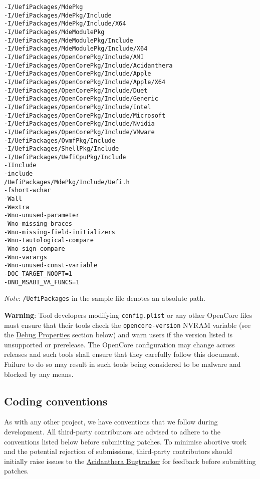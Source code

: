 \documentclass[]{article}
\begin{document}
\begin{lstlisting}[caption=ECC Configuration, label=eccfile, style=ocbash]
-I/UefiPackages/MdePkg
-I/UefiPackages/MdePkg/Include
-I/UefiPackages/MdePkg/Include/X64
-I/UefiPackages/MdeModulePkg
-I/UefiPackages/MdeModulePkg/Include
-I/UefiPackages/MdeModulePkg/Include/X64
-I/UefiPackages/OpenCorePkg/Include/AMI
-I/UefiPackages/OpenCorePkg/Include/Acidanthera
-I/UefiPackages/OpenCorePkg/Include/Apple
-I/UefiPackages/OpenCorePkg/Include/Apple/X64
-I/UefiPackages/OpenCorePkg/Include/Duet
-I/UefiPackages/OpenCorePkg/Include/Generic
-I/UefiPackages/OpenCorePkg/Include/Intel
-I/UefiPackages/OpenCorePkg/Include/Microsoft
-I/UefiPackages/OpenCorePkg/Include/Nvidia
-I/UefiPackages/OpenCorePkg/Include/VMware
-I/UefiPackages/OvmfPkg/Include
-I/UefiPackages/ShellPkg/Include
-I/UefiPackages/UefiCpuPkg/Include
-IInclude
-include
/UefiPackages/MdePkg/Include/Uefi.h
-fshort-wchar
-Wall
-Wextra
-Wno-unused-parameter
-Wno-missing-braces
-Wno-missing-field-initializers
-Wno-tautological-compare
-Wno-sign-compare
-Wno-varargs
-Wno-unused-const-variable
-DOC_TARGET_NOOPT=1
-DNO_MSABI_VA_FUNCS=1
\end{lstlisting}

\emph{Note}: \texttt{/UefiPackages} in the sample file denotes an absolute path.

\textbf{Warning}: Tool developers modifying \texttt{config.plist} or any other OpenCore
files must ensure that their tools check the \texttt{opencore-version} NVRAM variable
(see the \hyperref[miscdebugprops]{Debug Properties} section below) and warn users
if the version listed is unsupported or prerelease. The OpenCore configuration may change
across releases and such tools shall ensure that they carefully follow this document. Failure
to do so may result in such tools being considered to be malware and blocked by any means.

\subsection{Coding conventions}\label{configuration-conv}

As with any other project, we have conventions that we follow during development.
All third-party contributors are advised to adhere to the conventions listed below
before submitting patches. To minimise abortive work and the potential rejection of
submissions, third-party contributors should initially raise issues to the
\href{https://github.com/acidanthera/bugtracker}{Acidanthera Bugtracker}
for feedback before submitting patches.
\end{document}

